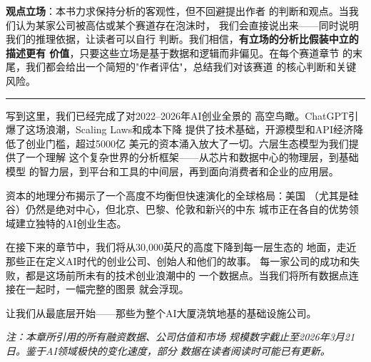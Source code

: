 \textbf{观点立场}：本书力求保持分析的客观性，但不回避提出作者
的判断和观点。当我们认为某家公司被高估或某个赛道存在泡沫时，
我们会直接说出来——同时说明我们的推理依据，让读者可以自行
判断。我们相信，\textbf{有立场的分析比假装中立的描述更有
价值}，只要这些立场是基于数据和逻辑而非偏见。在每个赛道章节
的末尾，我们都会给出一个简短的"作者评估"，总结我们对该赛道
的核心判断和关键风险。

\bigskip

\noindent\rule{\textwidth}{0.4pt}

\medskip

{\small 写到这里，我们已经完成了对2022--2026年AI创业全景的
高空鸟瞰。ChatGPT引爆了这场浪潮，Scaling Laws和成本下降
提供了技术基础，开源模型和API经济降低了创业门槛，超过5000亿
美元的资本涌入放大了一切。六层生态模型为我们提供了一个理解
这个复杂世界的分析框架——从芯片和数据中心的物理层，到基础模型
的智力层，到平台和工具的中间层，再到面向消费者和企业的应用层。

资本的地理分布揭示了一个高度不均衡但快速演化的全球格局：美国
（尤其是硅谷）仍然是绝对中心，但北京、巴黎、伦敦和新兴的中东
城市正在各自的优势领域建立独特的AI创业生态。

在接下来的章节中，我们将从30,000英尺的高度下降到每一层生态的
地面，走近那些正在定义AI时代的创业公司、创始人和他们的故事。
每一家公司的成功和失败，都是这场前所未有的技术创业浪潮中的
一个数据点。当我们将所有数据点连接在一起时，一幅完整的图景
就会浮现。

让我们从最底层开始——那些为整个AI大厦浇筑地基的基础设施公司。

\bigskip

\noindent\textit{注：本章所引用的所有融资数据、公司估值和市场
规模数字截止至2026年3月21日。鉴于AI领域极快的变化速度，部分
数据在读者阅读时可能已有更新。}}
